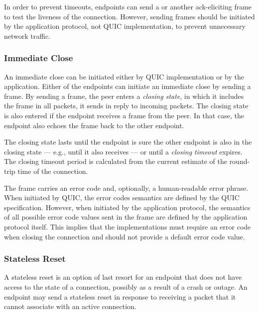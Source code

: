 In order to prevent timeouts, endpoints can send a \PING{} or another ack-eliciting frame to test
the liveness of the connection. However, sending \PING{} frames should be initiated by the
application protocol, not QUIC implementation, to prevent unnecessary network traffic.

\subsubsection{Immediate Close}

An immediate close can be initiated either by QUIC implementation or by the application. Either of
the endpoints can initiate an immediate close by sending a \CONNECTIONCLOSE{} frame. By sending a
\CONNECTIONCLOSE{} frame, the peer enters a \textit{closing state}, in which it includes the
\CONNECTIONCLOSE{} frame in all packets, it sends in reply to incoming packets. The closing state is
also entered if the endpoint receives a \CONNECTIONCLOSE{} frame from the peer. In that case, the
endpoint also echoes the \CONNECTIONCLOSE{} frame back to the other endpoint.

The closing state lasts until the endpoint is sure the other endpoint is also in the closing state
--- e.g., until it also receives \CONNECTIONCLOSE{} --- or until a \textit{closing timeout} expires.
The closing timeout period is calculated from the current estimate of the round-trip time of the
connection.

The \CONNECTIONCLOSE{} frame carries an error code and, optionally, a human-readable error phrase.
When initiated by QUIC, the error codes semantics are defined by the QUIC specification. However,
when initiated by the application protocol, the semantics of all possible error code values sent in
the frame are defined by the application protocol itself. This implies that the implementations must
require an error code when closing the connection and should not provide a default error code value.

\subsubsection{Stateless Reset}\label{sec:02-stateless-reset}

A stateless reset is an option of last resort for an endpoint that does not have access to the state
of a connection, possibly as a result of a crash or outage. An endpoint may send a stateless reset
in response to receiving a packet that it cannot associate with an active connection.

